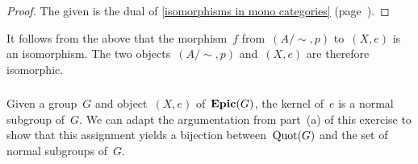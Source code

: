 \begin{proof}
	The given  is the dual of \cref{isomorphisms in mono categories} (page~\pageref{isomorphisms in mono categories}).
\end{proof}

It follows from the above  that the morphism~$f$ from~$(A / {∼}, p)$ to~$(X, e)$ is an isomorphism.
The two objects~$(A / {∼}, p)$ and~$(X, e)$ are therefore isomorphic.



\subsubsection{}

Given a group~$G$ and object~$(X, e)$ of~$\mathbf{Epic}(G)$, the kernel of~$e$ is a normal subgroup of~$G$.
We can adapt the argumentation from part~(a) of this exercise to show that this assignment yields a bijection between~$\operatorname{Quot}(G)$ and the set of normal subgroups of~$G$.
